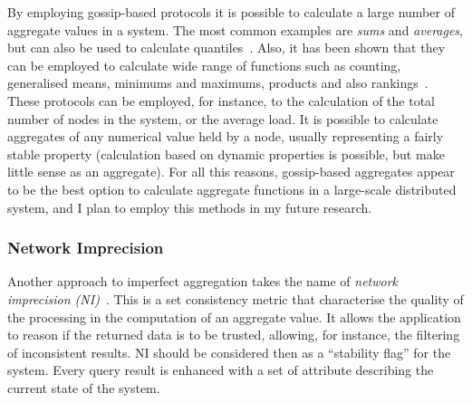 By employing gossip-based protocols it is possible to calculate a large number of aggregate values in a system. 
The most common examples are \emph{sums} and \emph{averages}, but can also be used to calculate
quantiles~\cite{gossip-aggregates}. Also, it has been shown that they can be employed to calculate wide range of
functions such as counting, generalised means, minimums and maximums, products and also
rankings~\cite{gossip-aggregates-large}.
These protocols can be employed, for instance, to the calculation of the total
number of nodes in the system, or the average load. It is possible to calculate aggregates of any numerical
value held by a node, usually representing a fairly stable property (calculation based on dynamic properties is
possible, but make little sense as an aggregate). For all this reasons, gossip-based aggregates appear to be the best
option to calculate aggregate functions in a large-scale distributed system, and I plan to employ this methods in my
future research.

\subsubsection*{Network Imprecision}

Another approach to imperfect aggregation takes the name of \emph{network imprecision (NI)}~\cite{network-imprecision}.
This is a set consistency metric that characterise the quality of the processing in the computation of an aggregate value.
It allows the application to reason if the returned data is to be trusted, allowing, for instance, the filtering of
inconsistent results. NI should be considered then as a ``stability flag'' for the system. Every query result is
enhanced with a set of attribute describing the current state of the system.


